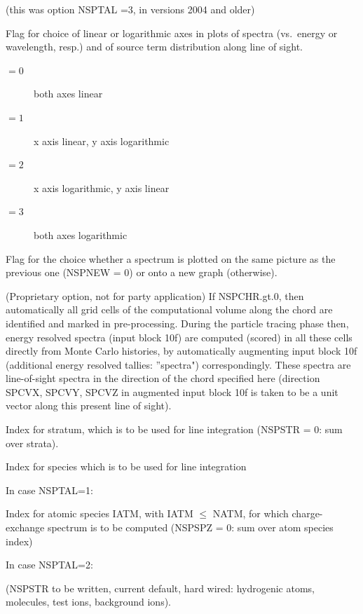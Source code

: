 \begin{description}
\begin{description}
                (this was option NSPTAL =3, in versions 2004 and older)
        \end{description}
  \item[NSPSCL] Flag for choice of linear or logarithmic axes in plots of spectra
        (vs.\ energy or wavelength, resp.) and of source term distribution along 
        line of sight.
        \begin{description}
          \item[$= 0$] both axes linear
          \item[$= 1$] x axis linear, y axis logarithmic
          \item[$= 2$] x axis logarithmic, y axis linear
          \item[$= 3$] both axes
                logarithmic
        \end{description}
  \item[NSPNEW] Flag for the choice whether a
        spectrum is plotted on the same picture as the previous one (NSPNEW = 0) or
        onto a new graph (otherwise).
  \item[NSPCHR] (Proprietary option, not for  party application) If
        NSPCHR.gt.0, then automatically all grid cells of the computational volume
        along the chord are identified and marked in pre-processing.
        During the particle tracing phase then, energy resolved spectra (input block
        10f) are computed (scored) in all these cells directly from Monte Carlo
        histories, by automatically augmenting input block 10f (additional energy
        resolved tallies: ''spectra") correspondingly.
        These spectra are line-of-sight spectra in the direction of the chord specified
        here (direction SPCVX, SPCVY, SPCVZ in augmented input block 10f is taken to be
        a unit vector along this present line of sight).
  \item[NSPSTR] Index for stratum, which is to be used for line integration
        (NSPSTR = 0: sum over strata).
  \item[NSPSPZ] Index for species which is to be used for line integration

        In case NSPTAL=1:

        Index for atomic species IATM, with IATM $\leq$ NATM, for which charge-exchange
        spectrum is to be computed (NSPSPZ = 0: sum over atom species index)

        In case NSPTAL=2:

        (NSPSTR to be written, current default, hard wired: hydrogenic atoms,
        molecules, test ions, background ions).


\end{description}
